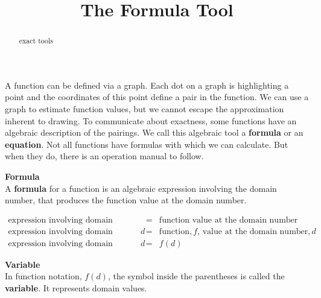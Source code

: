 \documentclass{ximera}
\title{The Formula Tool}
\begin{document}
\begin{abstract}
exact tools
\end{abstract}
\maketitle



A function can be defined via a graph. Each dot on a graph is highlighting a point and the coordinates of this point define a pair in the function. We can use a graph to estimate function values, but we cannot escape the approximation inherent to drawing.  To communicate about exactness, some functions have an algebraic description of the pairings.  We call this algebraic tool a \textbf{formula} or an \textbf{equation}. Not all functions have formulas with which we can calculate.  But when they do, there is an operation manual to follow.



\begin{definition}  \textbf{\textcolor{green!50!black}{Formula}} \\ 

A \textbf{formula} for a function is an algebraic expression involving the domain number, that produces the function value at the domain number.
\end{definition}



\[
\begin{array}{rcl}
     \text{expression involving domain number} & = &  \text{function value at the domain number}  \\ 
      \text{expression involving domain number,} \, d  & = &  \text{function,} \, f \text{, value at the domain number,} \, d \\ 
      \text{expression involving domain number,} \, d & = & f(d) 
\end{array}
\]







\begin{definition}  \textbf{\textcolor{green!50!black}{Variable}} \\ 


In function notation, $f(d)$, the symbol inside the parentheses is called the \textbf{variable}. It represents domain values.
\end{definition}
\end{document}
